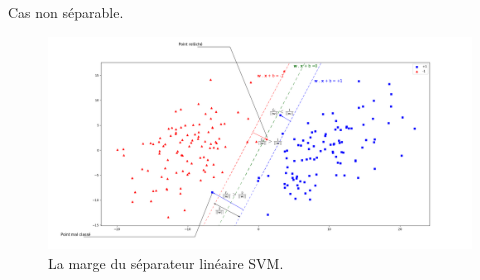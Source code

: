 \documentclass[9pt]{beamer}
\begin{document}
	\begin{frame}{Cas non séparable.}
		\begin{figure}[H]
			\includegraphics[width=\textwidth]{stable_margin}
			\caption{\label{fig::stable_margin} La marge du séparateur linéaire SVM.}
		\end{figure}
	\end{frame}
\end{document}
